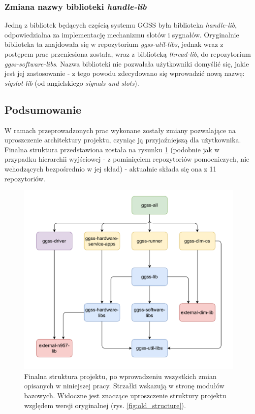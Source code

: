 \subsubsection{Zmiana nazwy biblioteki \emph{handle-lib}}
Jedną z bibliotek będących częścią systemu GGSS była biblioteka \emph{handle-lib}, odpowiedzialna za implementację mechanizmu slotów i sygnałów. Oryginalnie biblioteka ta znajdowała się w repozytorium \emph{ggss-util-libs}, jednak wraz z postępem prac przeniesiona została, wraz z biblioteką \emph{thread-lib}, do repozytorium \emph{ggss-software-libs}. Nazwa biblioteki nie pozwalała użytkowniki domyślić się, jakie jest jej zastosowanie - z tego powodu zdecydowano się wprowadzić nową nazwę: \emph{sigslot-lib} (od angielskiego \emph{signals and slots}).


\subsection{Podsumowanie}
W ramach przeprowadzonych prac wykonane zostały zmiany pozwalające na uproszczenie architektury projektu, czyniąc ją przyjaźniejszą dla użytkownika. Finalna struktura przedstawiona została na rysunku \ref{fig:new_architecture} (podobnie jak w przypadku hierarchii wyjściowej - z pominięciem repozytoriów pomocniczych, nie wchodzących bezpośrednio w jej skład) - aktualnie składa się ona z 11 repozytoriów.

\begin{figure}[H]
\centering
\includegraphics[width=\textwidth]{components/infra_images/new_architecture.pdf}
\caption{Finalna struktura projektu, po wprowadzeniu wszystkich zmian opisanych w niniejszej pracy. Strzałki wskazują w stronę modułów bazowych. Widoczne jest znaczące uproszczenie struktury projektu względem wersji oryginalnej (rys. \ref{fig:old_structure}).}
\label{fig:new_architecture}
\end{figure}

